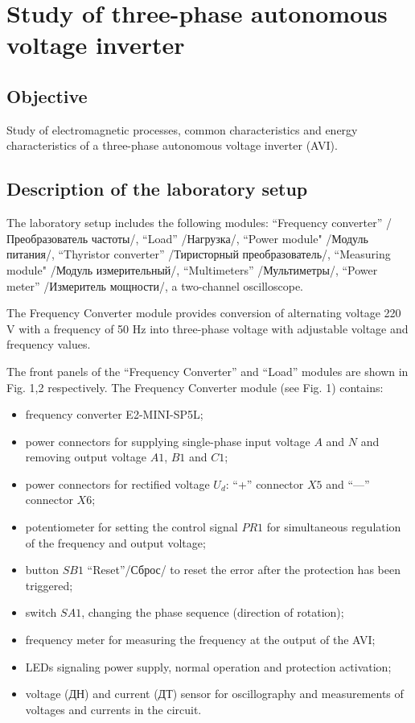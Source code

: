 \documentclass[a4paper,14pt]{article}
\begin{document}

\section{Study of three-phase autonomous voltage inverter}

\subsection{Objective}

Study of electromagnetic processes, common characteristics and energy characteristics of a three-phase autonomous voltage inverter (AVI).


\subsection{Description of the laboratory setup}

The laboratory setup includes the following modules:
“Frequency converter” /Преобразователь частоты/, “Load” /Нагрузка/, “Power module" /Модуль питания/, “Thyristor converter” /Тиристорный преобразователь/, “Measuring module" /Модуль измерительный/, “Multimeters” /Мультиметры/, “Power meter” /Измеритель мощности/, a two-channel oscilloscope.

The Frequency Converter module provides conversion of alternating voltage 220 V with a frequency of 50 Hz into three-phase voltage with adjustable voltage and frequency values.

The front panels of the “Frequency Converter” and “Load” modules are shown in Fig. 1,2 respectively. The Frequency Converter module (see Fig. 1) contains:

\begin{itemize}
\item frequency converter E2-MINI-SP5L;
\item power connectors for supplying single-phase input voltage $A$ and $N$ and removing output voltage $A1$, $B1$ and $C1$;
\item power connectors for rectified voltage $U_d$: “+” connector $X5$ and “—” connector $X6$;
\item potentiometer for setting the control signal $PR1$ for simultaneous regulation of the frequency and output voltage;
\item button $SB1$ “Reset”/Сброс/ to reset the error after the protection has been triggered;
\item switch $SA1$, changing the phase sequence (direction of rotation);
\item frequency meter for measuring the frequency at the output of the AVI;
\item LEDs signaling power supply, normal operation and protection activation;
\item voltage (ДН) and current (ДТ) sensor for oscillography and measurements of voltages and currents in the circuit.
\end{itemize}
\end{document}
